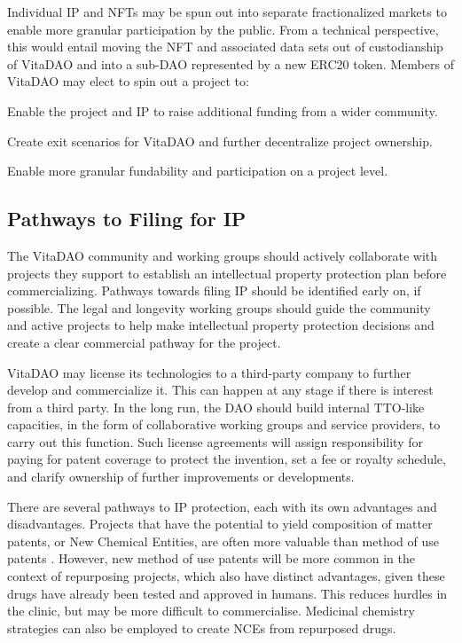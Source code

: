 \documentclass[10pt,letterpaper]{article}
\newenvironment{tight_enumerate}{
\begin{enumerate}
  \setlength{\itemsep}{0pt}
  \setlength{\parskip}{0pt}
}{\end{enumerate}}
\begin{document}
Individual IP and NFTs may be spun out into separate fractionalized markets to enable more granular participation by the public. From a technical perspective, this would entail moving the NFT and associated data sets out of custodianship of VitaDAO and into a sub-DAO represented by a new ERC20 token. Members of VitaDAO may elect to spin out a project to:

\begin{tight_enumerate}
\item Enable the project and IP to raise additional funding from a wider community.
\item Create exit scenarios for VitaDAO and further decentralize project ownership.
\item Enable more granular fundability and participation on a project level.
\end{tight_enumerate}

\subsection{Pathways to Filing for IP}
The VitaDAO community and working groups should actively collaborate with projects they support to establish an intellectual property protection plan before commercializing. Pathways towards filing IP should be identified early on, if possible. The legal and longevity working groups should guide the community and active projects to help make intellectual property protection decisions and create a clear commercial pathway for the project.

VitaDAO may license its technologies to a third-party company to further develop and commercialize it. This can happen at any stage if there is interest from a third party. In the long run, the DAO should build internal TTO-like capacities, in the form of collaborative working groups and service providers, to carry out this function. Such license agreements will assign responsibility for paying for patent coverage to protect the invention, set a fee or royalty schedule, and clarify ownership of further improvements or developments.

There are several pathways to IP protection, each with its own advantages and disadvantages. Projects that have the potential to yield composition of matter patents, or New Chemical Entities, are often more valuable than method of use patents \citep{BlackBox}. However, new method of use patents will be more common in the context of repurposing projects, which also have distinct advantages, given these drugs have already been tested and approved in humans. This reduces hurdles in the clinic, but may be more difficult to commercialise. Medicinal chemistry strategies can also be employed to create NCEs from repurposed drugs. 
\end{document}
